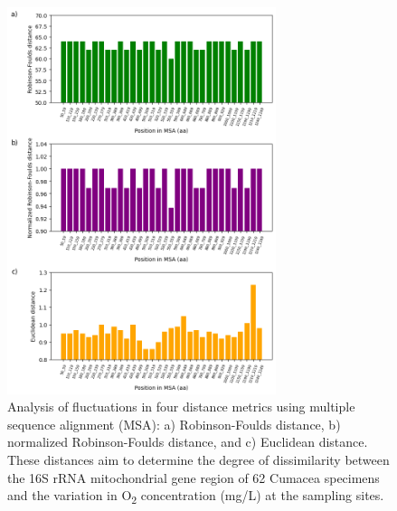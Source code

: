 {\begin{figure}[]
    \centering
    \includegraphics[width=0.7\textwidth]{figure6.png}
    \caption{Analysis of fluctuations in four distance metrics using multiple sequence alignment (MSA): a) Robinson-Foulds distance, b) normalized Robinson-Foulds distance, and c) Euclidean distance. These distances aim to determine the degree of dissimilarity between the 16S rRNA mitochondrial gene region of 62 Cumacea specimens and the variation in O\textsubscript{2} concentration (mg/L) at the sampling sites. \label{fig:fig7}}
\end{figure}

}
